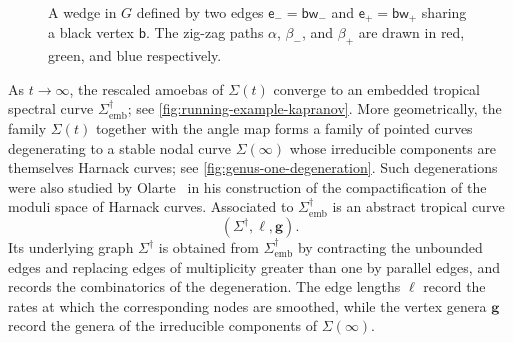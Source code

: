 \documentclass[12pt]{amsart}
\numberwithin{equation}{section}
\theoremstyle{definition}
\def\Gtor{G}
\def\trop{\dagger}
\def\bw{\mathsf{w}}
\def\bb{\mathsf{b}}
\def\be{{\mathsf{e}}}
\def\bface{\mathsf{f}}
\def\mcurve{\Sigma}
\def\tropmcurve{\mcurve^\trop}
\begin{document}
\begin{figure}
\centering
{}

\caption{
A wedge in $\Gtor$ defined by two edges
$\be_-=\bb\bw_-$ and $\be_+=\bb\bw_+$ sharing a black vertex $\bb$.
The zig-zag paths $\alpha$, $\beta_-$, and $\beta_+$ are drawn in
red, green, and blue respectively.
}
\label{fig:wedge}
\end{figure}

As $t\to\infty$, the rescaled amoebas of $\mcurve(t)$ converge to an
embedded tropical spectral curve
$\tropmcurve_{\mathrm{emb}}$; see
\cref{fig:running-example-kapranov}. More geometrically, the family $\mcurve(t)$ together with the angle map
forms a family of pointed curves degenerating to a stable nodal curve
$\mcurve(\infty)$ whose irreducible components are themselves Harnack
curves; see \cref{fig:genus-one-degeneration}. Such degenerations were
also studied by Olarte~\cite{Olarte} in his construction of the
compactification of the moduli space of Harnack curves. Associated to $\tropmcurve_{\mathrm{emb}}$ is an abstract tropical
curve
\[
(\tropmcurve,\ell,\bm g).
\]
Its underlying graph $\tropmcurve$ is obtained from
$\tropmcurve_{\mathrm{emb}}$ by contracting the unbounded edges and
replacing edges of multiplicity greater than one by parallel edges, and
records the combinatorics of the degeneration. The edge lengths $\ell$
record the rates at which the corresponding nodes are smoothed, while
the vertex genera $\bm g$ record the genera of the irreducible
components of $\mcurve(\infty)$.
\end{document}
